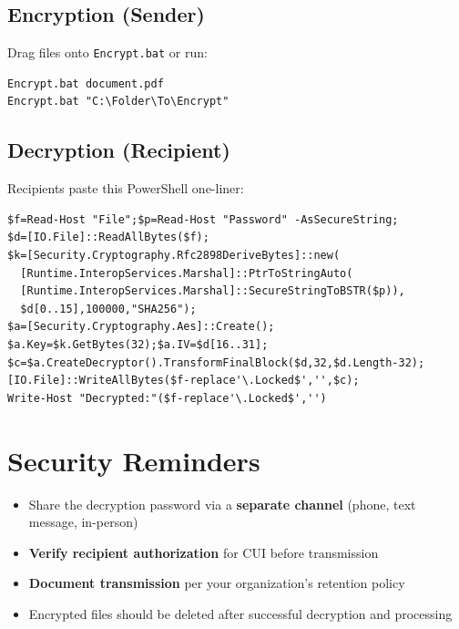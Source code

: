 \documentclass[11pt,letterpaper]{article}
\begin{document}
\subsection*{Encryption (Sender)}

Drag files onto \texttt{Encrypt.bat} or run:

\begin{lstlisting}
Encrypt.bat document.pdf
Encrypt.bat "C:\Folder\To\Encrypt"
\end{lstlisting}

\subsection*{Decryption (Recipient)}

Recipients paste this PowerShell one-liner:

\begin{lstlisting}[breaklines=true]
$f=Read-Host "File";$p=Read-Host "Password" -AsSecureString;
$d=[IO.File]::ReadAllBytes($f);
$k=[Security.Cryptography.Rfc2898DeriveBytes]::new(
  [Runtime.InteropServices.Marshal]::PtrToStringAuto(
  [Runtime.InteropServices.Marshal]::SecureStringToBSTR($p)),
  $d[0..15],100000,"SHA256");
$a=[Security.Cryptography.Aes]::Create();
$a.Key=$k.GetBytes(32);$a.IV=$d[16..31];
$c=$a.CreateDecryptor().TransformFinalBlock($d,32,$d.Length-32);
[IO.File]::WriteAllBytes($f-replace'\.Locked$','',$c);
Write-Host "Decrypted:"($f-replace'\.Locked$','')
\end{lstlisting}

\section*{Security Reminders}

\begin{itemize}
    \item Share the decryption password via a \textbf{separate channel} (phone, text message, in-person)
    \item \textbf{Verify recipient authorization} for CUI before transmission
    \item \textbf{Document transmission} per your organization's retention policy
    \item Encrypted files should be deleted after successful decryption and processing
\end{itemize}
\end{document}
